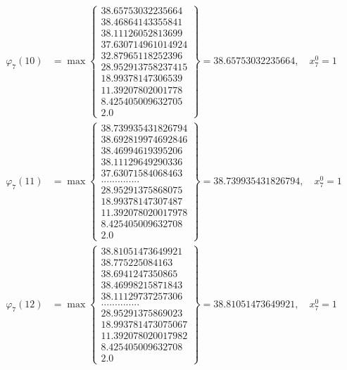 \documentclass{article}
\begin{document}
\begin{align*}
  
  
  
\varphi_{7}(10) &= \max \left\{ \begin{array}{c}
38.65753032235664 \\
 38.46864143355841 \\
 38.11126052813699 \\
 37.630714961014924 \\
 32.87965118252396 \\
 28.952913758237415 \\
 18.99378147306539 \\
 11.39207802001778 \\
 8.425405009632705 \\
 2.0
\end{array} \right\} = 38.65753032235664, \quad x_{7}^0 = 1\\
  
  
  
  
\varphi_{7}(11) &= \max \left\{ \begin{array}{c}
38.739935431826794 \\
 38.692819974692846 \\
 38.46994619395206 \\
 38.11129649290336 \\
 37.63071584068463 \\
 .............. \\
 28.95291375868075 \\
 18.99378147307487 \\
 11.392078020017978 \\
 8.425405009632708 \\
 2.0
\end{array} \right\} = 38.739935431826794, \quad x_{7}^0 = 1\\
  
  
  
  
\varphi_{7}(12) &= \max \left\{ \begin{array}{c}
38.81051473649921 \\
 38.775225084163 \\
 38.6941247350865 \\
 38.46998215871843 \\
 38.11129737257306 \\
 .............. \\
 28.95291375869023 \\
 18.993781473075067 \\
 11.392078020017982 \\
 8.425405009632708 \\
 2.0
\end{array} \right\} = 38.81051473649921, \quad x_{7}^0 = 1\\
  

\end{align*}
\end{document}
